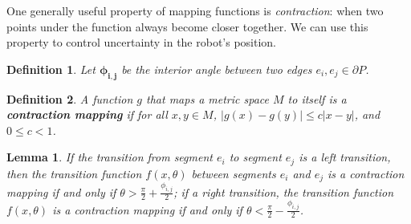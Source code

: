 \documentclass[sageh,times,Review]{sagej}
\newtheorem{definition}{Definition}
\newtheorem{lemma}{Lemma}
\begin{document}
One generally useful property of mapping functions is \emph{contraction}: 
when two points under the function always become closer together. 
We can use this property to control uncertainty in the robot's position.

\begin{definition}
Let $\bm{\phi_{i,j}}$ be the interior angle between two edges $e_i, e_j \in \partial P$. 
\end{definition}

\begin{definition}

A function $g$ that maps a metric space $M$ to itself is a \textbf{contraction
mapping} if for all
$x, y \in M$, $\lvert g(x) - g(y) \rvert \leq c \lvert x-y \rvert$, and $0 \leq c < 1$.
\end{definition}

\begin{lemma} \label{lemma:angrange}
If the transition from segment $e_i$ to segment $e_j$ is a left transition, then the
transition function $f(x, \theta)$ between segments $e_i$ and $e_j$ is a contraction
mapping if and only if $\theta > \frac{\pi}{2}+\frac{\phi_{i, j}}{2}$;
if a right transition, the transition function $f(x, \theta)$ is a contraction mapping if
and only if $\theta < \frac{\pi}{2}-\frac{\phi_{i, j}}{2}$.
\end{lemma}
\end{document}
